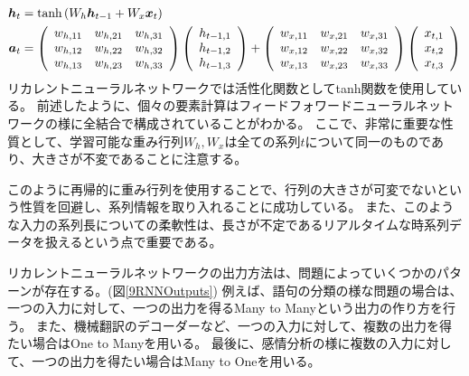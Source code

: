 \begin{equation}
 \begin{split}
  {\mbox{\boldmath{$h$}}}_t 
  &= \tanh{(W_h{\mbox{\boldmath{$h$}}}_{t-1}+W_x{\mbox{\boldmath{$x$}}}_t)}\\
  {\mbox{\boldmath{$a$}}}_t 
  &=
  \left(
    \begin{array}{ccc}
      w_{h,11} & w_{h,21} & w_{h,31} \\
      w_{h,12} & w_{h,22} & w_{h,32} \\
      w_{h,13} & w_{h,23} & w_{h,33}
    \end{array}
  \right)
  \left(
    \begin{array}{ccc}
      h_{t-1,1} \\
      h_{t-1,2} \\
      h_{t-1,3}
    \end{array}
  \right)
  +
  \left(
    \begin{array}{ccc}
      w_{x,11} & w_{x,21} & w_{x,31} \\
      w_{x,12} & w_{x,22} & w_{x,32} \\
      w_{x,13} & w_{x,23} & w_{x,33}
    \end{array}
  \right)
  \left(
    \begin{array}{ccc}
      x_{t,1} \\
      x_{t,2} \\
      x_{t,3}
    \end{array}
  \right)
 \end{split}
\end{equation}
リカレントニューラルネットワークでは活性化関数としてtanh関数を使用している。
前述したように、個々の要素計算はフィードフォワードニューラルネットワークの様に全結合で構成されていることがわかる。
ここで、非常に重要な性質として、学習可能な重み行列$W_{h}, W_{x}$は全ての系列$t$について同一のものであり、大きさが不変であることに注意する。

このように再帰的に重み行列を使用することで、行列の大きさが可変でないという性質を回避し、系列情報を取り入れることに成功している。
また、このような入力の系列長についての柔軟性は、長さが不定であるリアルタイムな時系列データを扱えるという点で重要である。

リカレントニューラルネットワークの出力方法は、問題によっていくつかのパターンが存在する。(図\ref{9RNNOutputs})
例えば、語句の分類の様な問題の場合は、一つの入力に対して、一つの出力を得るMany to Manyという出力の作り方を行う。
また、機械翻訳のデコーダーなど、一つの入力に対して、複数の出力を得たい場合はOne to Manyを用いる。
最後に、感情分析の様に複数の入力に対して、一つの出力を得たい場合はMany to Oneを用いる。

